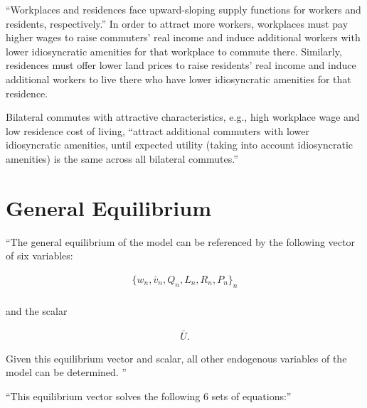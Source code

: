 \documentclass[10pt]{article}
\begin{document}
``Workplaces and residences face upward-sloping supply 
functions for workers and residents, respectively.''
In order to attract more workers, workplaces must pay 
higher wages to raise commuters' real income and
induce additional workers
with lower idiosyncratic amenities for that 
workplace to commute there.
Similarly, residences must offer lower land prices 
to raise residents' real income and induce additional
workers to live there who have lower idiosyncratic amenities
for that residence.

Bilateral commutes with attractive characteristics, 
e.g., high workplace wage and low residence cost of living, 
``attract additional commuters with lower 
idiosyncratic amenities, until expected utility 
(taking into account idiosyncratic amenities) 
is the same across all bilateral commutes.''


\section{General Equilibrium}

``The general equilibrium 
of the model 
can be referenced 
by the following 
vector of six variables: 

\begin{align}
    \{w_n, \bar{v}_n, Q_n, L_n, R_n, P_n\}_n \\
\end{align}

and the scalar 

\begin{align}
    \bar{U}.
\end{align}

Given this equilibrium vector 
and scalar, all other endogenous 
variables 
of the model can be determined. ''

``This equilibrium vector 
solves the following 6 sets of equations:''
\end{document}
